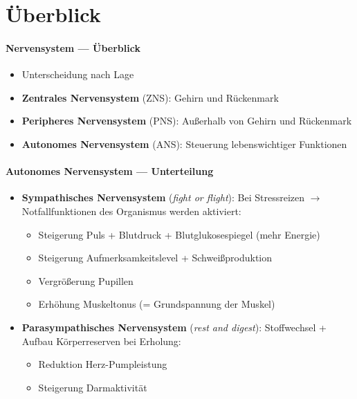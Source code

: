 \section*{Überblick}

\paragraph{Nervensystem --- Überblick}
\begin{itemize}
  \item Unterscheidung nach Lage
  \item \textbf{Zentrales Nervensystem} (ZNS): Gehirn und Rückenmark
  \item \textbf{Peripheres Nervensystem} (PNS): Außerhalb von Gehirn und Rückenmark
  \item \textbf{Autonomes Nervensystem} (ANS): Steuerung lebenswichtiger Funktionen
\end{itemize}

\paragraph{Autonomes Nervensystem --- Unterteilung}
\begin{itemize}
  \item \textbf{Sympathisches Nervensystem} (\emph{fight or flight}): Bei Stressreizen \( \to \) Notfallfunktionen des Organismus werden aktiviert:
  \begin{itemize}
    \item Steigerung Puls + Blutdruck + Blutglukosespiegel (mehr Energie)
    \item Steigerung Aufmerksamkeitslevel + Schweißproduktion
    \item Vergrößerung Pupillen
    \item Erhöhung Muskeltonus (= Grundspannung der Muskel)
  \end{itemize}
  \item \textbf{Parasympathisches Nervensystem} (\emph{rest and digest}): Stoffwechsel + Aufbau Körperreserven bei Erholung:
  \begin{itemize}
    \item Reduktion Herz-Pumpleistung
    \item Steigerung Darmaktivität
  \end{itemize}
\end{itemize}


